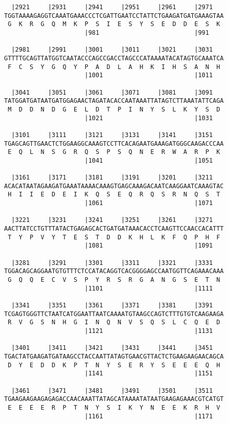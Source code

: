 \documentclass{article}
\begin{document}
\begin{Verbatim}
  |2921     |2931     |2941     |2951     |2961     |2971   
TGGTAAAAGAGGTCAAATGAAACCCTCGATTGAATCCTATTCTGAAGATGATGAAAGTAA
 G  K  R  G  Q  M  K  P  S  I  E  S  Y  S  E  D  D  E  S  K 
                      |981                          |991    
  
  |2981     |2991     |3001     |3011     |3021     |3031   
GTTTTGCAGTTATGGTCAATACCCAGCCGACCTAGCCCATAAAATACATAGTGCAAATCA
 F  C  S  Y  G  Q  Y  P  A  D  L  A  H  K  I  H  S  A  N  H 
                      |1001                         |1011   
  
  |3041     |3051     |3061     |3071     |3081     |3091   
TATGGATGATAATGATGGAGAACTAGATACACCAATAAATTATAGTCTTAAATATTCAGA
 M  D  D  N  D  G  E  L  D  T  P  I  N  Y  S  L  K  Y  S  D 
                      |1021                         |1031   
  
  |3101     |3111     |3121     |3131     |3141     |3151   
TGAGCAGTTGAACTCTGGAAGGCAAAGTCCTTCACAGAATGAAAGATGGGCAAGACCCAA
 E  Q  L  N  S  G  R  Q  S  P  S  Q  N  E  R  W  A  R  P  K 
                      |1041                         |1051   
  
  |3161     |3171     |3181     |3191     |3201     |3211   
ACACATAATAGAAGATGAAATAAAACAAAGTGAGCAAAGACAATCAAGGAATCAAAGTAC
 H  I  I  E  D  E  I  K  Q  S  E  Q  R  Q  S  R  N  Q  S  T 
                      |1061                         |1071   
  
  |3221     |3231     |3241     |3251     |3261     |3271   
AACTTATCCTGTTTATACTGAGAGCACTGATGATAAACACCTCAAGTTCCAACCACATTT
 T  Y  P  V  Y  T  E  S  T  D  D  K  H  L  K  F  Q  P  H  F 
                      |1081                         |1091   
  
  |3281     |3291     |3301     |3311     |3321     |3331   
TGGACAGCAGGAATGTGTTTCTCCATACAGGTCACGGGGAGCCAATGGTTCAGAAACAAA
 G  Q  Q  E  C  V  S  P  Y  R  S  R  G  A  N  G  S  E  T  N 
                      |1101                         |1111   
  
  |3341     |3351     |3361     |3371     |3381     |3391   
TCGAGTGGGTTCTAATCATGGAATTAATCAAAATGTAAGCCAGTCTTTGTGTCAAGAAGA
 R  V  G  S  N  H  G  I  N  Q  N  V  S  Q  S  L  C  Q  E  D 
                      |1121                         |1131   
  
  |3401     |3411     |3421     |3431     |3441     |3451   
TGACTATGAAGATGATAAGCCTACCAATTATAGTGAACGTTACTCTGAAGAAGAACAGCA
 D  Y  E  D  D  K  P  T  N  Y  S  E  R  Y  S  E  E  E  Q  H 
                      |1141                         |1151   
  
  |3461     |3471     |3481     |3491     |3501     |3511   
TGAAGAAGAAGAGAGACCAACAAATTATAGCATAAAATATAATGAAGAGAAACGTCATGT
 E  E  E  E  R  P  T  N  Y  S  I  K  Y  N  E  E  K  R  H  V 
                      |1161                         |1171   
  

\end{Verbatim}
\end{document}
